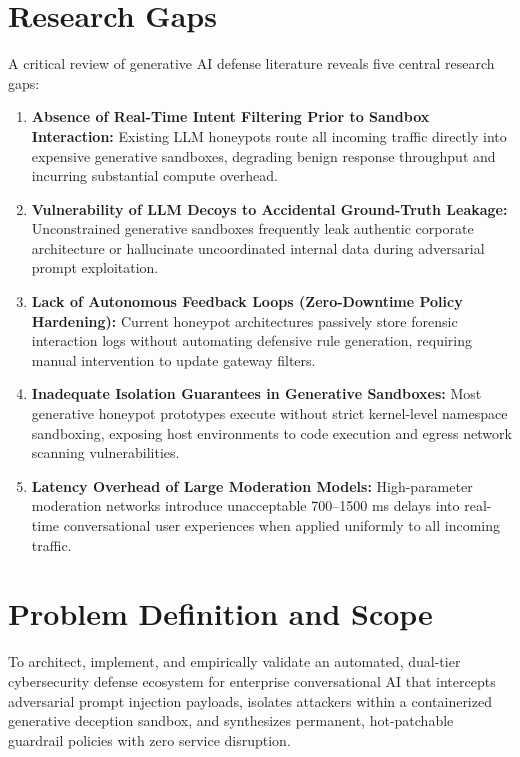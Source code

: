\documentclass[12pt,a4paper,oneside]{report}
\begin{document}
\section{Research Gaps}
A critical review of generative AI defense literature reveals five central research gaps:
\begin{enumerate}
    \item \textbf{Absence of Real-Time Intent Filtering Prior to Sandbox Interaction:} Existing LLM honeypots route all incoming traffic directly into expensive generative sandboxes, degrading benign response throughput and incurring substantial compute overhead.
    \item \textbf{Vulnerability of LLM Decoys to Accidental Ground-Truth Leakage:} Unconstrained generative sandboxes frequently leak authentic corporate architecture or hallucinate uncoordinated internal data during adversarial prompt exploitation.
    \item \textbf{Lack of Autonomous Feedback Loops (Zero-Downtime Policy Hardening):} Current honeypot architectures passively store forensic interaction logs without automating defensive rule generation, requiring manual intervention to update gateway filters.
    \item \textbf{Inadequate Isolation Guarantees in Generative Sandboxes:} Most generative honeypot prototypes execute without strict kernel-level namespace sandboxing, exposing host environments to code execution and egress network scanning vulnerabilities.
    \item \textbf{Latency Overhead of Large Moderation Models:} High-parameter moderation networks introduce unacceptable 700--1500 ms delays into real-time conversational user experiences when applied uniformly to all incoming traffic.
\end{enumerate}

\section{Problem Definition and Scope}
To architect, implement, and empirically validate an automated, dual-tier cybersecurity defense ecosystem for enterprise conversational AI that intercepts adversarial prompt injection payloads, isolates attackers within a containerized generative deception sandbox, and synthesizes permanent, hot-patchable guardrail policies with zero service disruption.
\end{document}
